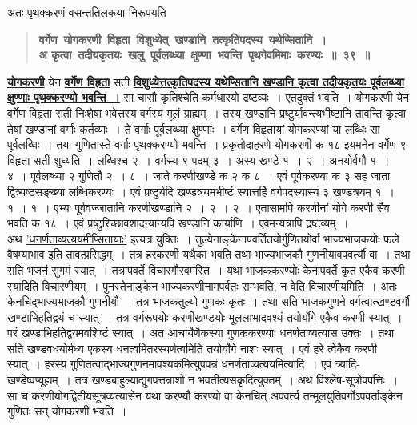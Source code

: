 \documentclass[11pt, openany]{book}
\begin{document}
\newpage

\begin{sloppypar}

{\small अतः पृथक्करणं वसन्ततिलकया निरूपयति\textendash }

 \label{4.39}
\begin{quote}
{\large \textbf{{ \hspace{-10mm} वर्गेण~योगकरणी~विहृता~विशुध्येत्~खण्डानि~तत्कृतिपदस्य~यथेप्सितानि~।\\
{\color{white}अ} \hspace{-9mm} कृत्वा~तदीयकृतयः~खलु~पूर्वलब्ध्या~क्षुण्णा~भवन्ति~पृथगेवमिमाः~करण्यः~॥~३९~॥}}}
\end{quote}

\hyperref[4.39]{\textbf{योगकरणी}} येन \hyperref[4.39]{\textbf{वर्गेण विहृता}} सती \hyperref[4.39]{\textbf{विशुध्येत्तत्कृतिपदस्य यथेप्सितानि खण्डानि कृत्वा तदीयकृतयः पूर्वलब्ध्या क्षुण्णाः पृथक्करण्यो भवन्ति~।}} सा चासौ कृतिश्चेति कर्मधारयो द्रष्टव्यः~। एतदुक्तं भवति~। योगकरणी येन वर्गेण विहृता सती निःशेषा भवेत्तस्य वर्गस्य मूलं ग्राह्यम्~। तस्य खण्डानि प्रष्टुर्यावन्त्यभीष्टानि तावन्ति कृत्वा तेषां खण्डानां वर्गाः कर्तव्याः~। ते वर्गाः पूर्वलब्ध्या क्षुण्णाः~। वर्गेण विहृतायां योगकरण्यां या लब्धिः सा पूर्वलब्धिः~। तया गुणितास्ते वर्गाः पृथक्करण्यो भवन्ति~। प्रकृतोदाहरणे योगकरणी क १८ इयमनेन वर्गेण ९ विहृता सती शुध्यति~। लब्धिश्च २~। वर्गस्य ९ पदम् ३~। अस्य खण्डे १~। २~। अनयोर्वगौ १~। ४~। पूर्वलब्ध्या २ गुणितौ २~। ८~। जाते करणीखण्डे क २ क ८~। एवं पूर्वकरण्या क ३ सह जाता द्वित्र्यष्टसङ्ख्या लब्धिकरण्यः~। एवं प्रष्टुर्यदि खण्डत्रयमभीष्टं स्यात्तर्हि वर्गपदस्यास्य ३ खण्डत्रयम् १~। १~। १~। एभ्यः पूर्ववज्जातानि करणीखण्डानि २~। २~। २~। एतासामपि करणीनां योगे करणी सैव भवति क १८~। एवं प्रष्टुरिच्छावशादन्यान्यपि खण्डानि कार्याणि~। एवमन्यत्रापि द्रष्टव्यम्~।\\

अथ \hyperref[4.38]{'धनर्णताव्यत्ययमीप्सितायाः'} इत्यत्र युक्तिः~। तुल्येनाङ्केनापवर्तितयोर्गुणितयोर्वा भाज्यभाजकयोः फले वैषम्याभाव इति तावत्प्रसिद्धम्~। तत्र हरकरणी यथैका भवति तथा भाज्यभाजकौ गुणनीयावपवर्त्यौ वा~। तथा सति भजनं सुगमं स्यात्~। तत्रापवर्ते विचारगौरवमस्ति~। यथा भाजककरण्योः केनापवर्ते कृत एकैव करणी स्यादिति विचारणीयम्~। पुनस्तेनाङ्केन भाज्यकरणीनामपर्वतः सम्भवति, न वेति विचारणीयमिति~। अतः केनचिद्भाज्यभाजकौ गुणनीयौ~। तत्र भाजकतुल्यो गुणकः कृतः~। तथा सति भाजकगुणने वर्गत्वात्खण्डवर्गौ खण्डाभिहतिद्वयं च स्यात्~। तत्र वर्गरूपयोः करणीखण्डयोः मूललाभादवश्यं तयोर्योगे एकैव करणी स्यात्~। परं खण्डाभिहतिद्वयमवशिष्टं स्यात्~। अत आचार्येणैकस्या गुणककरण्याः धनर्णताव्यत्यास उक्तः~। तथा सति खण्डवधयोर्मध्य एकस्य धनत्वमितरस्यर्णत्वमिति तयोर्योगे नाशः स्यात्~। एवं हरे त्वेकैव करणी स्यात्~। हरस्य गुणितत्वाद्भाज्यगुणनमावश्यकमित्युपपन्नं धनर्णताव्यत्ययमित्यादि~। एवं त्र्यादि-खण्डेष्वप्यूह्यम्~। तत्र खण्डबाहुल्याद्युगपत्तन्नाशो न भवतीत्यसकृदित्युक्तम्~। अथ विश्लेष-सूत्रोपपत्तिः~। सा च करणीयोगद्वितीयसूत्रव्यत्यासेन यथा करण्यौ करण्यो वा केनचित् अपवर्त्य तन्मूलयुतिवर्गोऽपवर्ताङ्केन गुणितः सन् योगकरणी भवति~।
\end{sloppypar}
\end{document}
